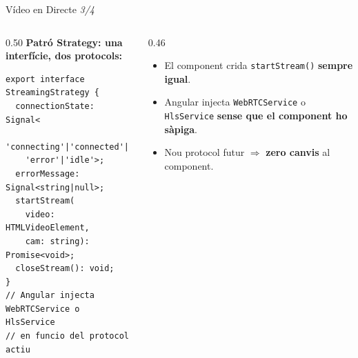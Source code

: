 \begin{frame}[fragile]{Vídeo en Directe \small\textit{3/4}}
  \begin{columns}[T]
    \begin{column}{0.50\textwidth}
      \small\textbf{Patró Strategy: una interfície, dos protocols:}
      \vspace{0.3em}

      \begin{lstlisting}[style=tsbox]
export interface StreamingStrategy {
  connectionState: Signal<
    'connecting'|'connected'|
    'error'|'idle'>;
  errorMessage: Signal<string|null>;
  startStream(
    video: HTMLVideoElement,
    cam: string): Promise<void>;
  closeStream(): void;
}
// Angular injecta WebRTCService o HlsService
// en funcio del protocol actiu \end{lstlisting}
    \end{column}

    \begin{column}{0.46\textwidth}
      \vspace{0.8em}
      \begin{itemize}
        \item El component crida \texttt{startStream()} \textbf{sempre igual}.
        \item Angular injecta \texttt{WebRTCService} o \texttt{HlsService} \textbf{sense que el component ho sàpiga}.
        \item Nou protocol futur $\Rightarrow$ \textbf{zero canvis} al component.
      \end{itemize}
    \end{column}
  \end{columns}
\end{frame}

